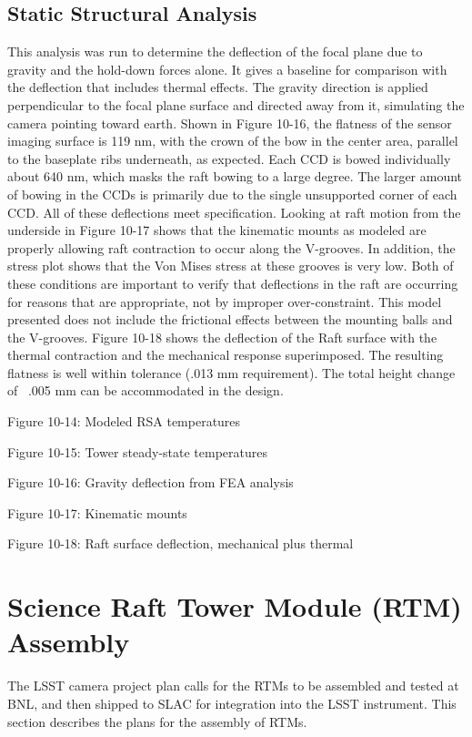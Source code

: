 \subsection{Static Structural Analysis}
This analysis was run to determine the deflection of the focal plane due to gravity and the hold-down forces alone. It gives a baseline for comparison with the deflection that includes thermal effects. The gravity direction is applied perpendicular to the focal plane surface and directed away from it, simulating the camera pointing toward earth.
Shown in Figure 10-16, the flatness of the sensor imaging surface is 119 nm, with the crown of the bow in the center area, parallel to the baseplate ribs underneath, as expected. Each CCD is bowed individually about 640 nm, which masks the raft bowing to a large degree. The larger amount of bowing in the CCDs is primarily due to the single unsupported corner of each CCD. All of these deflections meet specification.
Looking at raft motion from the underside in Figure 10-17 shows that the kinematic mounts as modeled are properly allowing raft contraction to occur along the V-grooves. In addition, the stress plot shows that the Von Mises stress at these grooves is very low. Both of these conditions are important to verify that deflections in the raft are occurring for reasons that are appropriate, not by improper over-constraint. This model presented does not include the frictional effects between the mounting balls and the V-grooves.
Figure 10-18 shows the deflection of the Raft surface with the thermal contraction and the mechanical response superimposed. The resulting flatness is well within tolerance (.013 mm requirement). The total height change of ~.005 mm can be accommodated in the design.

Figure 10-14: Modeled RSA temperatures
 
Figure 10-15: Tower steady-state temperatures
 
Figure 10-16: Gravity deflection from FEA analysis

Figure 10-17: Kinematic mounts
 
Figure 10-18: Raft surface deflection, mechanical plus thermal
 
\section{Science Raft Tower Module (RTM) Assembly}

The LSST camera project plan calls for the RTMs to be assembled and tested at BNL, and then shipped to SLAC for integration into the LSST instrument. This section describes the plans for the assembly of RTMs. 

